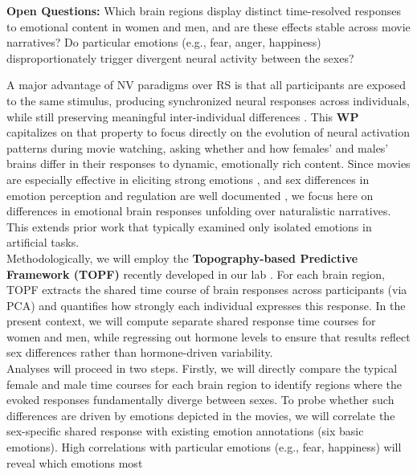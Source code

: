 \documentclass[11pt,a4paper]{article}
\begin{document}
\textbf{Open Questions:} Which brain regions display distinct time-resolved responses to emotional content in 
women and men, and are these effects stable across movie narratives? Do particular emotions (e.g., fear, anger, happiness) 
disproportionately trigger divergent neural activity between the sexes? 

A major advantage of NV paradigms over RS is that all participants are exposed to the same stimulus, 
producing synchronized neural responses across individuals, while still preserving meaningful inter-individual 
differences \parencite{finnIdiosynchronySharedResponses2020a,vanderwalIndividualDifferencesFunctional2017}. 
This \textbf{WP} capitalizes on that property to focus directly on the evolution of neural activation patterns 
during movie watching, asking whether and how females' and males' brains differ in their responses 
to dynamic, emotionally rich content. Since movies are especially effective in eliciting 
strong emotions \parencite{grossEmotionElicitationUsing1995,westermannRelativeEffectivenessValidity1996}, 
and sex differences in emotion perception and regulation are well documented 
\parencite{domesNeuralCorrelatesSex2010a,gardenerSexDifferencesEmotion2013a}, 
we focus here on differences in emotional brain responses unfolding over naturalistic narratives. 
This extends prior work that typically examined only isolated emotions in artificial tasks.\\  
Methodologically, we will employ the \textbf{Topography-based Predictive Framework (TOPF)} recently 
developed in our lab \parencite{liTopographybasedPredictiveFramework2023a}. For each brain region, 
TOPF extracts the shared time course of brain responses across participants (via PCA) and quantifies how 
strongly each individual expresses this response. In the present context, we will compute separate 
shared response time courses for women and men, while regressing out hormone levels to ensure that 
results reflect sex differences rather than hormone-driven variability.\\ 
Analyses will proceed in two steps. Firstly, we will directly compare the typical female and male time courses 
for each brain region to identify regions where the evoked responses fundamentally diverge between sexes. 
To probe whether such differences are driven by emotions depicted in the movies, we will correlate the 
sex-specific shared response with existing emotion annotations (six basic emotions). 
High correlations with particular emotions (e.g., fear, happiness) will reveal which emotions most 
\end{document}
